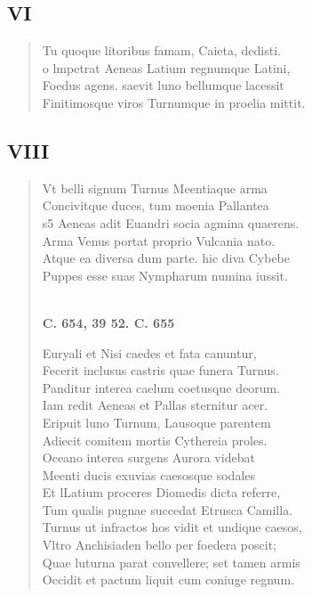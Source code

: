 \documentclass[11pt, a4paper]{report}
\begin{document}
            \subsection*{VI}
      \begin{verse}
      Tu quoque litoribus famam, Caieta, dedisti. \\ o lmpetrat Aeneas Latium regnumque Latini, \\ Foedus agens. saevit luno bellumque lacessit \\ Finitimosque viros Turnumque in proelia mittit. \\ 
      \end{verse}
  
            \subsection*{VIII}
      \begin{verse}
      Vt belli signum Turnus \rbrack  Meentiaque arma \\ Concivitque duces, tum moenia Pallantea \\ s5 Aeneas adit Euandri socia agmina quaerens. \\ Arma Venus portat proprio Vulcania nato. \\ Atque ea diversa dum parte. \rbrack  hic diva Cybebe \\ Puppes esse suas Nympharum numina iussit. \\ 
        ﻿\pagebreak 
    \begin{center} \textbf{C. 654, 39 52. C. 655} \end{center} \marginpar{[128]} Euryali et Nisi caedes et fata canuntur, \\ Fecerit inclusus castris quae funera Turnus. \\ Panditur interea \rbrack  caelum coetusque deorum. \\ Iam redit Aeneas et Pallas sternitur acer. \\ Eripuit luno Turnum, Lausoque parentem \\ Adiecit comitem mortis Cythereia proles. \\ Oceano interea surgens Aurora \rbrack  videbat \\ Meenti ducis exuvias caesosque sodales \\ Et lLatium proceres Diomedis dicta referre, \\ Tum qualis pugnae succedat Etrusca Camilla. \\ Turnus ut infractos \rbrack   \lbrack hos \rbrack  vidit et undique caesos, \\ Vltro Anchisiaden bello per foedera poscit; \\ Quae luturna parat convellere; set tamen armis \\ Occidit et pactum liquit cum coniuge regnum. \\ 
      \end{verse}
  
\end{document}
